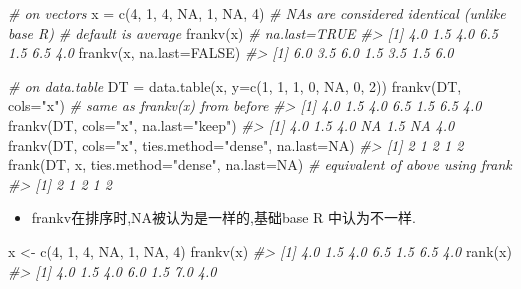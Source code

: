 \documentclass[
]{book}
\newenvironment{Shaded}{\begin{snugshade}}{\end{snugshade}}
\newcommand{\AttributeTok}[1]{\textcolor[rgb]{0.77,0.63,0.00}{#1}}
\newcommand{\CommentTok}[1]{\textcolor[rgb]{0.56,0.35,0.01}{\textit{#1}}}
\newcommand{\ConstantTok}[1]{\textcolor[rgb]{0.00,0.00,0.00}{#1}}
\newcommand{\DecValTok}[1]{\textcolor[rgb]{0.00,0.00,0.81}{#1}}
\newcommand{\FunctionTok}[1]{\textcolor[rgb]{0.00,0.00,0.00}{#1}}
\newcommand{\NormalTok}[1]{#1}
\newcommand{\OtherTok}[1]{\textcolor[rgb]{0.56,0.35,0.01}{#1}}
\newcommand{\StringTok}[1]{\textcolor[rgb]{0.31,0.60,0.02}{#1}}
\providecommand{\tightlist}{%
  \setlength{\itemsep}{0pt}\setlength{\parskip}{0pt}}
\begin{document}
\begin{Shaded}
\begin{Highlighting}[]
\CommentTok{\# on vectors}
\NormalTok{x }\OtherTok{=} \FunctionTok{c}\NormalTok{(}\DecValTok{4}\NormalTok{, }\DecValTok{1}\NormalTok{, }\DecValTok{4}\NormalTok{, }\ConstantTok{NA}\NormalTok{, }\DecValTok{1}\NormalTok{, }\ConstantTok{NA}\NormalTok{, }\DecValTok{4}\NormalTok{)}
\CommentTok{\# NAs are considered identical (unlike base R)}
\CommentTok{\# default is average}
\FunctionTok{frankv}\NormalTok{(x) }\CommentTok{\# na.last=TRUE}
\CommentTok{\#\textgreater{} [1] 4.0 1.5 4.0 6.5 1.5 6.5 4.0}
\FunctionTok{frankv}\NormalTok{(x, }\AttributeTok{na.last=}\ConstantTok{FALSE}\NormalTok{)}
\CommentTok{\#\textgreater{} [1] 6.0 3.5 6.0 1.5 3.5 1.5 6.0}

\CommentTok{\# on data.table}
\NormalTok{DT }\OtherTok{=} \FunctionTok{data.table}\NormalTok{(x, }\AttributeTok{y=}\FunctionTok{c}\NormalTok{(}\DecValTok{1}\NormalTok{, }\DecValTok{1}\NormalTok{, }\DecValTok{1}\NormalTok{, }\DecValTok{0}\NormalTok{, }\ConstantTok{NA}\NormalTok{, }\DecValTok{0}\NormalTok{, }\DecValTok{2}\NormalTok{))}
\FunctionTok{frankv}\NormalTok{(DT, }\AttributeTok{cols=}\StringTok{"x"}\NormalTok{) }\CommentTok{\# same as frankv(x) from before}
\CommentTok{\#\textgreater{} [1] 4.0 1.5 4.0 6.5 1.5 6.5 4.0}
\FunctionTok{frankv}\NormalTok{(DT, }\AttributeTok{cols=}\StringTok{"x"}\NormalTok{, }\AttributeTok{na.last=}\StringTok{"keep"}\NormalTok{)}
\CommentTok{\#\textgreater{} [1] 4.0 1.5 4.0  NA 1.5  NA 4.0}
\FunctionTok{frankv}\NormalTok{(DT, }\AttributeTok{cols=}\StringTok{"x"}\NormalTok{, }\AttributeTok{ties.method=}\StringTok{"dense"}\NormalTok{, }\AttributeTok{na.last=}\ConstantTok{NA}\NormalTok{)}
\CommentTok{\#\textgreater{} [1] 2 1 2 1 2}
\FunctionTok{frank}\NormalTok{(DT, x, }\AttributeTok{ties.method=}\StringTok{"dense"}\NormalTok{, }\AttributeTok{na.last=}\ConstantTok{NA}\NormalTok{) }\CommentTok{\# equivalent of above using frank}
\CommentTok{\#\textgreater{} [1] 2 1 2 1 2}
\end{Highlighting}
\end{Shaded}

\begin{itemize}
\tightlist
\item
  frankv在排序时,NA被认为是一样的,基础base R 中认为不一样.
\end{itemize}

\begin{Shaded}
\begin{Highlighting}[]
\NormalTok{x }\OtherTok{\textless{}{-}}  \FunctionTok{c}\NormalTok{(}\DecValTok{4}\NormalTok{, }\DecValTok{1}\NormalTok{, }\DecValTok{4}\NormalTok{, }\ConstantTok{NA}\NormalTok{, }\DecValTok{1}\NormalTok{, }\ConstantTok{NA}\NormalTok{, }\DecValTok{4}\NormalTok{) }
\FunctionTok{frankv}\NormalTok{(x)}
\CommentTok{\#\textgreater{} [1] 4.0 1.5 4.0 6.5 1.5 6.5 4.0}
\FunctionTok{rank}\NormalTok{(x)}
\CommentTok{\#\textgreater{} [1] 4.0 1.5 4.0 6.0 1.5 7.0 4.0}
\end{Highlighting}
\end{Shaded}
\end{document}

